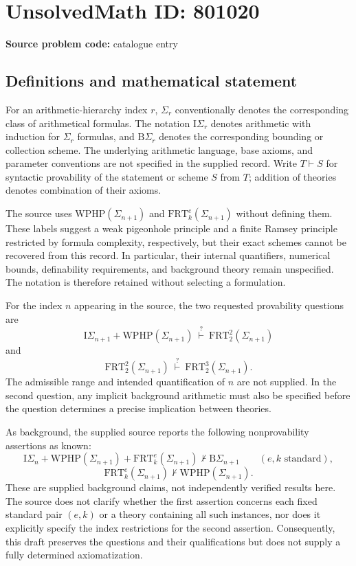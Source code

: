 \documentclass[11pt]{article}
\begin{document}
\section*{UnsolvedMath ID: 801020}
\textbf{Source problem code:} catalogue entry
\subsection{Definitions and mathematical statement}
For an arithmetic-hierarchy index \(r\), \(\Sigma_r\) conventionally denotes the corresponding class of arithmetical formulas. The notation \(\mathrm{I}\Sigma_r\) denotes arithmetic with induction for \(\Sigma_r\) formulas, and \(\mathrm{B}\Sigma_r\) denotes the corresponding bounding or collection scheme. The underlying arithmetic language, base axioms, and parameter conventions are not specified in the supplied record. Write \(T\vdash S\) for syntactic provability of the statement or scheme \(S\) from \(T\); addition of theories denotes combination of their axioms.

The source uses \(\mathrm{WPHP}(\Sigma_{n+1})\) and \(\mathrm{FRT}^{e}_{k}(\Sigma_{n+1})\) without defining them. These labels suggest a weak pigeonhole principle and a finite Ramsey principle restricted by formula complexity, respectively, but their exact schemes cannot be recovered from this record. In particular, their internal quantifiers, numerical bounds, definability requirements, and background theory remain unspecified. The notation is therefore retained without selecting a formulation.

For the index \(n\) appearing in the source, the two requested provability questions are
\[
\mathrm{I}\Sigma_{n+1}+\mathrm{WPHP}(\Sigma_{n+1})
\ \stackrel{?}{\vdash}\ 
\mathrm{FRT}^{2}_{2}(\Sigma_{n+1})
\]
and
\[
\mathrm{FRT}^{2}_{2}(\Sigma_{n+1})
\ \stackrel{?}{\vdash}\ 
\mathrm{FRT}^{3}_{2}(\Sigma_{n+1}).
\]
The admissible range and intended quantification of \(n\) are not supplied. In the second question, any implicit background arithmetic must also be specified before the question determines a precise implication between theories.

As background, the supplied source reports the following nonprovability assertions as known:
\[
\mathrm{I}\Sigma_n+\mathrm{WPHP}(\Sigma_{n+1})
+\mathrm{FRT}^{e}_{k}(\Sigma_{n+1})
\nvdash \mathrm{B}\Sigma_{n+1}
\qquad(e,k\text{ standard}),
\]
\[
\mathrm{FRT}^{e}_{k}(\Sigma_{n+1})
\nvdash \mathrm{WPHP}(\Sigma_{n+1}).
\]
These are supplied background claims, not independently verified results here. The source does not clarify whether the first assertion concerns each fixed standard pair \((e,k)\) or a theory containing all such instances, nor does it explicitly specify the index restrictions for the second assertion. Consequently, this draft preserves the questions and their qualifications but does not supply a fully determined axiomatization.
\end{document}
